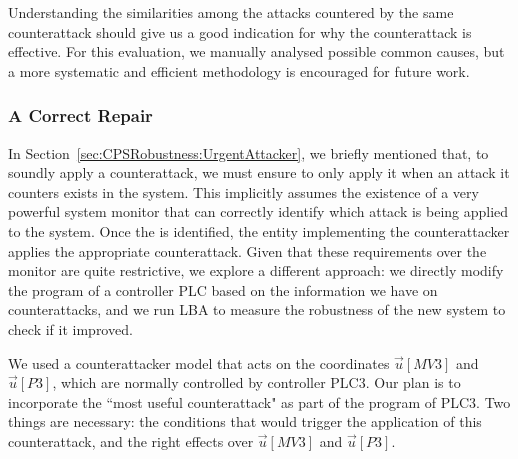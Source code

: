 {%
Understanding the similarities among the attacks countered by the same counterattack should give us a good indication for why the counterattack is effective. For this evaluation, we manually analysed possible common causes, but a more systematic and efficient methodology is encouraged for future work. 

\subsubsection{A Correct Repair}
\label{sec:CPSRobustness:CorrectRepair}
In Section~\ref{sec:CPSRobustness:UrgentAttacker}, we briefly mentioned that, to soundly apply a counterattack, we must ensure to only apply it when an attack it counters exists in the system. This implicitly assumes the existence of a very powerful system monitor that can correctly identify which attack is being applied to the system. Once the is identified, the entity implementing the counterattacker applies the appropriate counterattack. Given that these requirements over the monitor are quite restrictive, we explore a different approach: we directly modify the program of a controller PLC based on the information we have on counterattacks, and we run LBA to measure the robustness of the new system to check if it improved. 

We used a counterattacker model that acts on the coordinates $\vec{u}[MV3]$ and $\vec{u}[P3]$, which are normally controlled by controller PLC3. Our plan is to incorporate the ``most useful counterattack" as part of the program of PLC3. Two things are necessary: the conditions that would trigger the application of this counterattack, and the right effects over $\vec{u}[MV3]$ and $\vec{u}[P3]$. 

}
